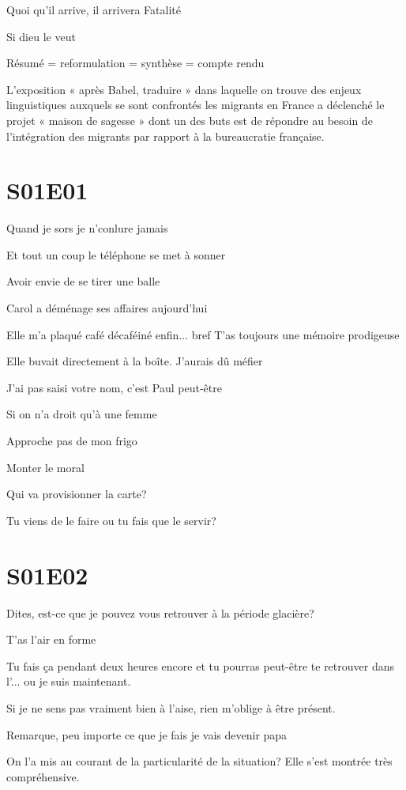 \documentclass[10pt,a4paper,twoside]{article} %
\begin{document}
\newpage

Quoi qu’il arrive, il arrivera   
Fatalité   

Si dieu le veut   

Résumé = reformulation = synthèse = compte rendu   

L’exposition « après Babel, traduire » dans laquelle on trouve des enjeux linguistiques auxquels se sont confrontés les migrants en France a déclenché le projet « maison de sagesse » dont un des buts est de répondre au besoin de l’intégration des migrants par rapport à la bureaucratie française.   

\section{S01E01}
Quand je sors je n’conlure jamais

Et tout un coup le téléphone se met à sonner

Avoir envie de se tirer une balle

Carol a déménage ses affaires aujourd’hui

Elle m’a plaqué
café décaféiné 
enfin... bref
T’as toujours une mémoire prodigeuse

Elle buvait directement à la boîte. J’aurais dû méfier

J’ai pas saisi votre nom, c’est Paul peut-être

Si on n’a droit qu’à une femme

Approche pas de mon frigo

Monter le moral

Qui va provisionner la carte?

Tu viens de le faire ou tu fais que le servir?

\section{S01E02}

Dites, est-ce que je pouvez vous retrouver à la période glacière?

T’as l’air en forme

Tu fais ça pendant deux heures encore et tu pourras peut-être te retrouver dans l’... ou je suis maintenant.

Si je ne sens pas vraiment bien à l’aise, rien m’oblige à être présent.

Remarque, peu importe ce que je fais je vais devenir papa

On l’a mis au courant de la particularité de la situation? Elle s’est montrée très compréhensive.
\end{document}
